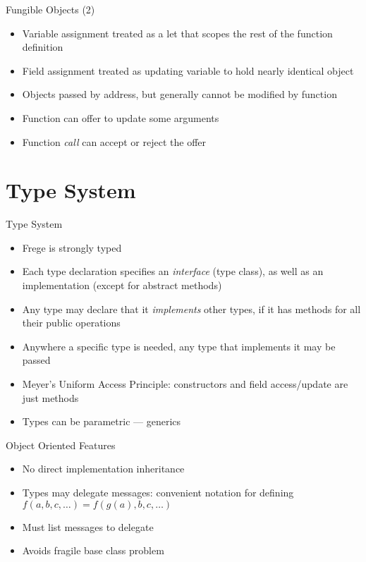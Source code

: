 \documentclass[12pt]{beamer}
\newcommand{\frege}{\textsf{Frege}\xspace}
\begin{document}
\begin{frame}{\LARGE Fungible Objects (2)}
  \begin{itemize}
  \item Variable assignment treated as a \textsf{let} that scopes the rest of
    the function definition
  \item Field assignment treated as updating variable to hold nearly
    identical object
  \item Objects passed by address, but generally cannot be modified by
    function
  \item Function can offer to update some arguments
  \item Function \emph{call} can accept or reject the offer
  \end{itemize}
\end{frame}


\section{Type System}
\begin{frame}{\LARGE Type System}
  \begin{itemize}
  \item \frege is strongly typed
  \item Each type declaration specifies an \emph{interface} (type class), as
    well as an implementation (except for abstract methods)
  \item Any type may declare that it \emph{implements} other types, if it has
    methods for all their public operations
  \item Anywhere a specific type is needed, any type that implements it may
    be passed
  \item Meyer's Uniform Access Principle: constructors and field
    access/update are just methods
  \item Types can be parametric --- generics
  \end{itemize}
\end{frame}


\begin{frame}{\LARGE Object Oriented Features}
  \begin{itemize}
  \item No direct implementation inheritance
  \item Types may delegate messages:  convenient notation for defining
    $f(a, b, c, \ldots) = f(g(a), b, c, \ldots)$
  \item Must list messages to delegate
  \item Avoids fragile base class problem
  \end{itemize}
\end{frame}


\end{document}
